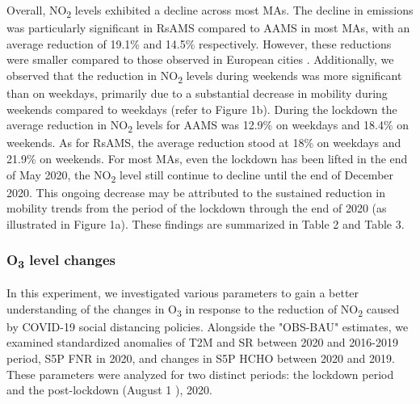 Overall, NO\textsubscript{2} levels exhibited a decline across most MAs. The decline in emissions was particularly significant in RsAMS compared to AAMS in most MAs, with an average reduction of 19.1\% and 14.5\% respectively. However, these reductions were smaller compared to those observed in European cities \citep{barre2021estimating,grange2021covid}. Additionally, we observed that the reduction in NO\textsubscript{2} levels during weekends was more significant than on weekdays, primarily due to a substantial decrease in mobility during weekends compared to weekdays (refer to Figure 1b). During the lockdown the average reduction in NO\textsubscript{2} levels for AAMS was 12.9\% on weekdays and 18.4\% on weekends. As for RsAMS, the average reduction stood at 18\% on weekdays and 21.9\% on weekends. For most MAs, even the lockdown has been lifted in the end of May 2020, the NO\textsubscript{2} level still continue to decline until the end of December 2020. This ongoing decrease may be attributed to the sustained reduction in mobility trends from the period of the lockdown through the end of 2020 (as illustrated in Figure 1a). These findings are summarized in Table 2 and Table 3. \par

\subsubsection*{O\textsubscript{3} level changes}
In this experiment, we investigated various parameters to gain a better understanding of the changes in O\textsubscript{3} in response to the reduction of NO\textsubscript{2} caused by COVID-19 social distancing policies. Alongside the "OBS-BAU" estimates, we examined standardized anomalies of T2M and SR between 2020 and 2016-2019 period, S5P FNR in 2020, and changes in S5P HCHO between 2020 and 2019. These parameters were analyzed for two distinct periods: the lockdown period and the post-lockdown (August 1 ), 2020. \par

